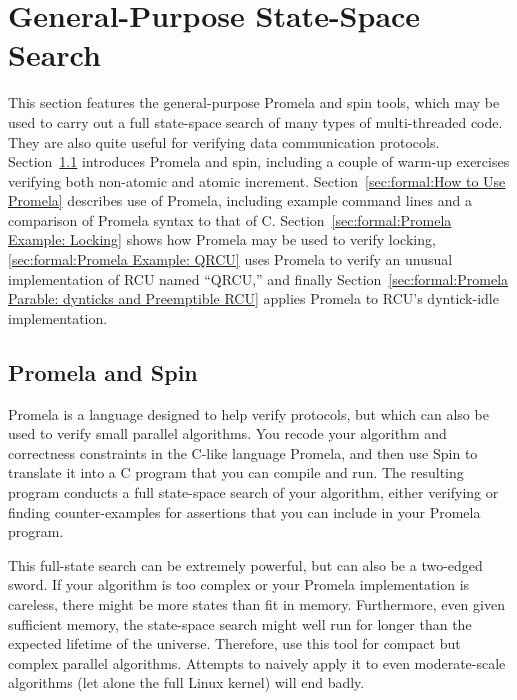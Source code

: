
\section{General-Purpose State-Space Search}
\label{sec:formal:General-Purpose State-Space Search}

This section features the general-purpose Promela and spin tools,
which may be used to carry out a full
state-space search of many types of multi-threaded code.
They are also quite useful for verifying data communication protocols.
Section~\ref{sec:formal:Promela and Spin}
introduces Promela and spin, including a couple of warm-up exercises
verifying both non-atomic and atomic increment.
Section~\ref{sec:formal:How to Use Promela}
describes use of Promela, including example command lines and a
comparison of Promela syntax to that of C.
Section~\ref{sec:formal:Promela Example: Locking}
shows how Promela may be used to verify locking,
\ref{sec:formal:Promela Example: QRCU}
uses Promela to verify an unusual implementation of RCU named ``QRCU,''
and finally
Section~\ref{sec:formal:Promela Parable: dynticks and Preemptible RCU}
applies Promela to RCU's dyntick-idle implementation.

\subsection{Promela and Spin}
\label{sec:formal:Promela and Spin}

Promela is a language designed to help verify protocols, but which
can also be used to verify small parallel algorithms.
You recode your algorithm and correctness constraints in the C-like
language Promela, and then use Spin to translate it into a C program
that you can compile and run.
The resulting program conducts a full state-space search of your
algorithm, either verifying or finding counter-examples for
assertions that you can include in your Promela program.

This full-state search can be extremely powerful, but can also be a two-edged
sword.
If your algorithm is too complex or your Promela implementation is
careless, there might be more states than fit in memory.
Furthermore, even given sufficient memory, the state-space search might
well run for longer than the expected lifetime of the universe.
Therefore, use this tool for compact but complex parallel algorithms.
Attempts to naively apply it to even moderate-scale algorithms (let alone
the full Linux kernel) will end badly.

